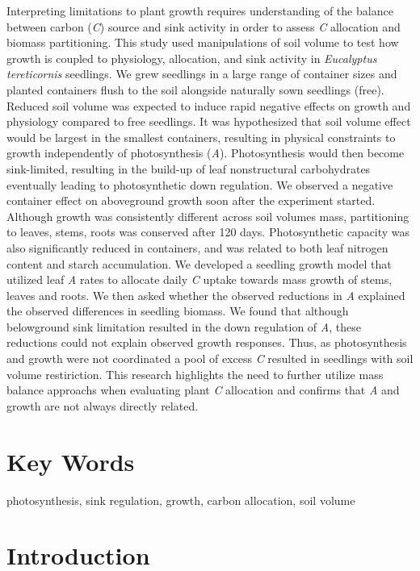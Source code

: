 \documentclass[a4paper]{article}\usepackage[]{graphicx}\usepackage[]{color}
\begin{document}
Interpreting limitations to plant growth requires understanding of the balance between carbon (\textit{C}) source and sink activity in order to assess \textit{C} allocation and biomass partitioning. This study used manipulations of soil volume to test how growth is coupled to physiology, allocation, and sink activity in \textit{Eucalyptus tereticornis} seedlings. We grew seedlings in a large range of container sizes and planted containers flush to the soil alongside naturally sown seedlings (free). Reduced soil volume was expected to induce rapid negative effects on growth and physiology compared to free seedlings. It was hypothesized that soil volume effect would be largest in the smallest containers, resulting in physical constraints to growth independently of photosynthesis (\textit{A}). Photosynthesis would then become sink-limited, resulting in the build-up of leaf nonstructural carbohydrates eventually leading to photosynthetic down regulation. We observed a negative container effect on aboveground growth soon after the experiment started. Although growth was consistently different across soil volumes mass, partitioning to leaves, stems, roots was conserved after 120 days. Photosynthetic capacity was also significantly reduced in containers, and was related to both leaf nitrogen content and starch accumulation. We developed a seedling growth model that utilized leaf \textit{A} rates to allocate daily \textit{C} uptake towards mass growth of stems, leaves and roots. We then asked whether the observed reductions in \textit{A} explained the observed differences in seedling biomass. We found that although belowground sink limitation resulted in the down regulation of \textit{A}, these reductions could not explain observed growth responses. Thus, as photosynthesis and growth were not coordinated a pool of excess \textit{C} resulted in seedlings with soil volume restiriction. This research highlights the need to further utilize mass balance approachs when evaluating plant \textit{C} allocation and confirms that \textit{A} and growth are not always directly related.

\section*{Key Words}

photosynthesis, sink regulation, growth, carbon allocation, soil volume


\section*{Introduction}
\end{document}
